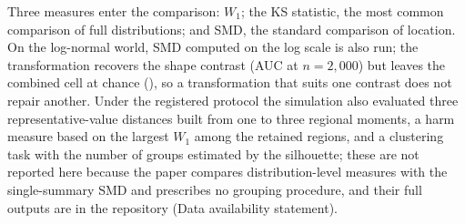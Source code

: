 \documentclass[AMA,Times1COL]{WileyNJDv5}
\begin{document}
Three measures enter the comparison: $W_1$; the KS statistic, the most common comparison of full distributions; and SMD, the standard comparison of location. On the log-normal world, SMD computed on the log scale is also run; the transformation recovers the shape contrast (AUC  at $n = 2{,}000$) but leaves the combined cell at chance (), so a transformation that suits one contrast does not repair another. Under the registered protocol the simulation also evaluated three representative-value distances built from one to three regional moments, a harm measure based on the largest $W_1$ among the retained regions, and a clustering task with the number of groups estimated by the silhouette; these are not reported here because the paper compares distribution-level measures with the single-summary SMD and prescribes no grouping procedure, and their full outputs are in the repository (Data availability statement).
\end{document}
